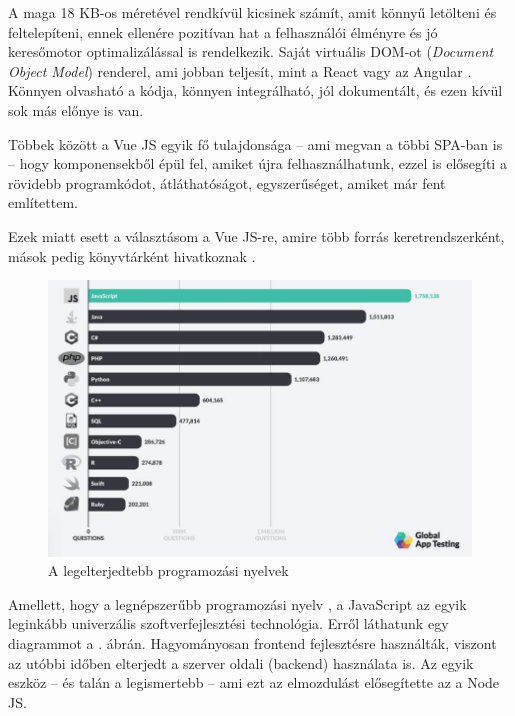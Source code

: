 A maga 18 KB-os méretével rendkívül kicsinek számít, amit könnyű letölteni és feltelepíteni, ennek ellenére pozitívan hat a felhasználói élményre és jó keresőmotor optimalizálással is rendelkezik. Saját virtuális DOM-ot (\textit{Document Object Model}) renderel, ami jobban teljesít, mint a React vagy az Angular \cite{benchmark}. Könnyen olvasható a kódja, könnyen integrálható, jól dokumentált, és ezen kívül sok más előnye is van.

Többek között a Vue JS egyik fő tulajdonsága -- ami megvan a többi SPA-ban is -- hogy komponensekből épül fel, amiket újra felhasználhatunk, ezzel is elősegíti a rövidebb programkódot, átláthatóságot, egyszerűséget, amiket már fent említettem.

Ezek miatt esett a választásom a Vue JS-re, amire több forrás keretrendszerként, mások pedig könyvtárként hivatkoznak
\cite{vue}.


\begin{figure}[h!]
	\centering
	\includegraphics[width=\textwidth]{images/js-popilarity.png}
	\caption{A legelterjedtebb programozási nyelvek \cite{js-popularity}}
	\label{fig:js-popularity}
\end{figure}

Amellett, hogy a legnépszerűbb programozási nyelv \cite{js-popularity}, a JavaScript az egyik leginkább univerzális szoftverfejlesztési technológia. Erről láthatunk egy diagrammot a . ábrán. Hagyományosan frontend fejlesztésre használták, viszont az utóbbi időben elterjedt a szerver oldali (backend) használata is. Az egyik eszköz -- és talán a legismertebb -- ami ezt az elmozdulást elősegítette az a Node JS.

